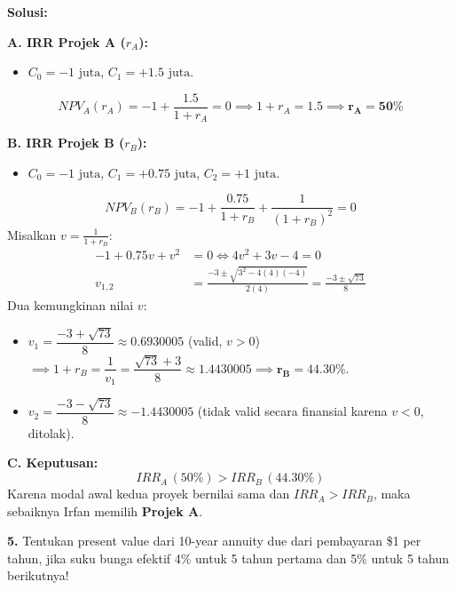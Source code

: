 \documentclass[11pt,a4paper]{article}
\begin{document}
\textbf{Solusi:}

\textbf{A. IRR Projek A ($r_A$):}
\begin{itemize}[leftmargin=1.5em, topsep=0pt, itemsep=0pt]
    \item $C_0 = -1\text{ juta}$, $C_1 = +1.5\text{ juta}$.
\end{itemize}
\begin{equation*}
    NPV_A(r_A) = -1 + \frac{1.5}{1 + r_A} = 0 \implies 1 + r_A = 1.5 \implies \mathbf{r_A = 50\%}
\end{equation*}

\textbf{B. IRR Projek B ($r_B$):}
\begin{itemize}[leftmargin=1.5em, topsep=0pt, itemsep=0pt]
    \item $C_0 = -1\text{ juta}$, $C_1 = +0.75\text{ juta}$, $C_2 = +1\text{ juta}$.
\end{itemize}
\begin{equation*}
    NPV_B(r_B) = -1 + \frac{0.75}{1 + r_B} + \frac{1}{(1 + r_B)^2} = 0
\end{equation*}
Misalkan $v = \frac{1}{1 + r_B}$:
\begin{align*}
    -1 + 0.75v + v^2 &= 0 \iff 4v^2 + 3v - 4 = 0 \\[0.3em]
    v_{1,2} &= \frac{-3 \pm \sqrt{3^2 - 4(4)(-4)}}{2(4)} = \frac{-3 \pm \sqrt{73}}{8}
\end{align*}
Dua kemungkinan nilai $v$:
\begin{itemize}[leftmargin=1.5em, topsep=0pt, itemsep=0pt]
    \item $v_1 = \dfrac{-3 + \sqrt{73}}{8} \approx \mathbf{0.6930005}$ (valid, $v > 0$) $\implies 1 + r_B = \dfrac{1}{v_1} = \dfrac{\sqrt{73} + 3}{8} \approx 1.4430005 \implies \mathbf{r_B = 44.30\%}$.
    \item $v_2 = \dfrac{-3 - \sqrt{73}}{8} \approx \mathbf{-1.4430005}$ (tidak valid secara finansial karena $v < 0$, ditolak).
\end{itemize}

\textbf{C. Keputusan:}
\begin{equation*}
    IRR_A \, (50\%) > IRR_B \, (44.30\%)
\end{equation*}
Karena modal awal kedua proyek bernilai sama dan $IRR_A > IRR_B$, maka sebaiknya Irfan memilih \textbf{Projek A}.

\vspace{0.5em}

\begin{tcolorbox}
\textbf{5.} Tentukan present value dari 10-year annuity due dari pembayaran \$1 per tahun, jika suku bunga efektif 4\% untuk 5 tahun pertama dan 5\% untuk 5 tahun berikutnya!
\end{tcolorbox}
\end{document}
